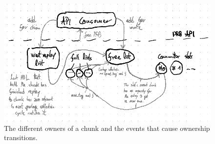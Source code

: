 \documentclass[12pt,a4paper,twoside]{book}
\begin{document}
\begin{figure}[H]
    \centering
    \includegraphics[width=\textwidth]{fig/prb_chunk_ownership_cycle__transitions}
    \caption{The different owners of a chunk and the events that cause ownership transitions.}
    \label{fig:prb_chunk_ownership_cycle__transitions}
\end{figure}
\end{document}
